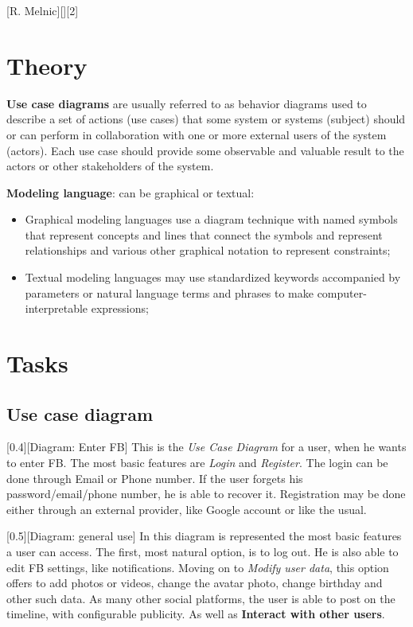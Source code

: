 \documentclass{article}
\begin{document}
	[R. Melnic][][2]

	\section{Theory}
		\par \textbf{Use case diagrams} are usually referred to as behavior diagrams used to describe a set of actions (use cases) that some system or systems (subject) should or can perform in collaboration with one or more external users of the system (actors). Each use case should provide some observable and valuable result to the actors or other stakeholders of the system.

		\bigskip
		\textbf{Modeling language}: can be graphical or textual:
		\begin{itemize}
			\item Graphical modeling languages use a diagram technique with named symbols that represent concepts and lines that connect the symbols and represent relationships and various other graphical notation to represent constraints;
			\item Textual modeling languages may use standardized keywords accompanied by parameters or natural language terms and phrases to make computer-interpretable expressions;
		\end{itemize}

	\section{Tasks}
		\subsection{Use case diagram}
			[0.4][Diagram: Enter FB]
			This is the \textit{Use Case Diagram} for a user, when he wants to enter FB. The most basic features are \textit{Login} and \textit{Register}. The login can be done through Email or Phone number. If the user forgets his password/email/phone number, he is able to recover it. Registration may be done either through an external provider, like Google account or like the usual.


			[0.5][Diagram: general use]
			In this diagram is represented the most basic features a user can access. The first, most natural option, is to log out. He is also able to edit FB settings, like notifications. Moving on to \textit{Modify user data}, this option offers to add photos or videos, change the avatar photo, change birthday and other such data. As many other social platforms, the user is able to post on the timeline, with configurable publicity. As well as \textbf{Interact with other users}.
\end{document}
